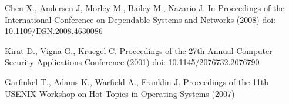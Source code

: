 \begin{thebibliography}{4}
        Chen X., Andersen J, Morley M., Bailey M., Nazario J.
        \newblock In Proceedings of the International Conference on Dependable Systems and Networks (2008)
        \newblock doi: 10.1109/DSN.2008.4630086

        Kirat D., Vigna G., Kruegel C.
        \newblock Proceedings of the 27th Annual Computer Security Applications Conference (2001)
        \newblock doi: 10.1145/2076732.2076790

        Garfinkel T., Adams K., Warfield A., Franklin J.
        \newblock Proceedings of the 11th USENIX Workshop on Hot Topics in Operating Systems (2007)
\end{thebibliography}
